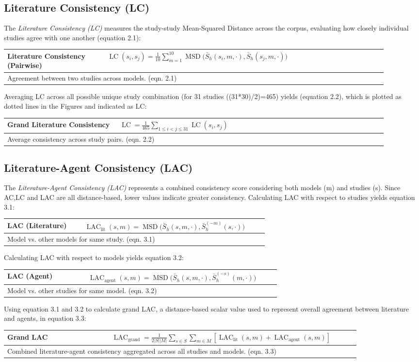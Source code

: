 \documentclass[12pt]{article}
\renewcommand{\arraystretch}{1.06}
\newcommand{\EquationBox}[3]{%
  \begin{center}
  \begingroup
  \small
  \setlength{\tabcolsep}{6pt}%
  \renewcommand{\arraystretch}{1.18}%
  \begin{tabular}{|p{0.27\linewidth}|p{0.64\linewidth}|}
  \hline
  \textbf{#1} & #2 \\
  \hline
  \multicolumn{2}{|p{0.94\linewidth}|}{#3} \\
  \hline
  \end{tabular}
  \endgroup
  \end{center}
}
\newcommand{\EquationBoxWideLeft}[3]{%
  \begin{center}
  \begingroup
  \small
  \setlength{\tabcolsep}{6pt}%
  \renewcommand{\arraystretch}{1.18}%
  \begin{tabular}{|p{0.24\linewidth}|p{0.67\linewidth}|}
  \hline
  \textbf{#1} & #2 \\
  \hline
  \multicolumn{2}{|p{0.94\linewidth}|}{#3} \\
  \hline
  \end{tabular}
  \endgroup
  \end{center}
}
\begin{document}
\subsection{Literature Consistency (LC)}\label{literature-consistency-lc}

The \emph{Literature Consistency (LC)} measures the study-study Mean-Squared Distance across the corpus, evaluating how closely individual studies agree with one another (equation 2.1):
\EquationBoxWideLeft{Literature Consistency (Pairwise)}{\(\displaystyle \operatorname{LC}(s_i,s_j)=\frac{1}{10}\sum_{m=1}^{10}\operatorname{MSD}\bigl(\bar{S}_h(s_i,m,\cdot),\bar{S}_h(s_j,m,\cdot)\bigr)\)}{Agreement between two studies across models. (eqn. 2.1)}
Averaging LC across all possible unique study combination (for 31 studies ((31*30)/2)=465) yields (equation 2.2), which is plotted as dotted lines in the Figures and indicated as LC:
\EquationBox{Grand Literature Consistency}{\(\displaystyle \operatorname{LC}=\frac{1}{465}\sum_{1\le i<j\le 31}\operatorname{LC}(s_i,s_j)\)}{Average consistency across study pairs. (eqn. 2.2)}
\subsection{Literature-Agent Consistency (LAC)}\label{literature-agent-consistency-lac}

The \emph{Literature-Agent Consistency (LAC)} represents a combined consistency score considering both models (m) and studies (s). Since AC,LC and LAC are all distance-based, lower values indicate greater consistency. Calculating LAC with respect to studies yields equation 3.1:
\EquationBox{LAC (Literature)}{\(\displaystyle \operatorname{LAC}_{\mathrm{lit}}(s,m)=\operatorname{MSD}\bigl(\bar{S}_h(s,m,\cdot),\bar{S}_h^{(-m)}(s,\cdot)\bigr)\)}{Model vs. other models for same study. (eqn. 3.1)}
Calculating LAC with respect to models yields equation 3.2:
\EquationBox{LAC (Agent)}{\(\displaystyle \operatorname{LAC}_{\mathrm{agent}}(s,m)=\operatorname{MSD}\bigl(\bar{S}_h(s,m,\cdot),\bar{S}_h^{(-s)}(m,\cdot)\bigr)\)}{Model vs. other studies for same model. (eqn. 3.2)}
Using equation 3.1 and 3.2 to calculate grand LAC, a distance-based scalar value used to represent overall agreement between literature and agents, in equation 3.3:
\EquationBox{Grand LAC}{\(\displaystyle \operatorname{LAC}_{\mathrm{grand}}=\frac{1}{2|S||M|}\sum_{s\in S}\sum_{m\in M}\left[\operatorname{LAC}_{\mathrm{lit}}(s,m)+\operatorname{LAC}_{\mathrm{agent}}(s,m)\right]\)}{Combined literature-agent consistency aggregated across all studies and models. (eqn. 3.3)}
\end{document}
